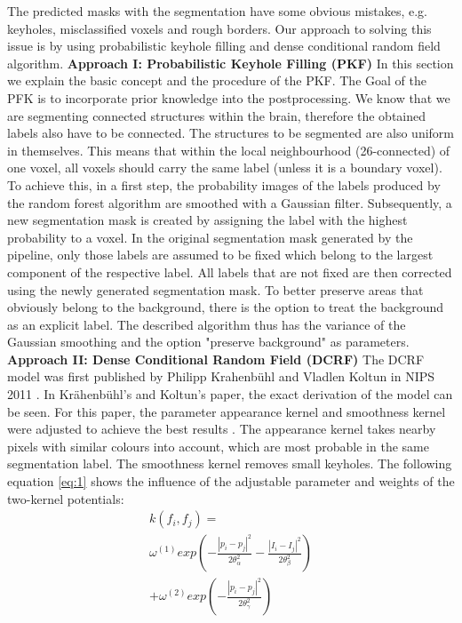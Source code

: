 \documentclass[journal]{IEEEtran}
\begin{document}
The predicted masks with the segmentation have some obvious mistakes, e.g. keyholes, misclassified voxels and rough borders. Our approach to solving this issue is by using probabilistic keyhole filling and dense conditional random field algorithm. 
\newline
\textbf{Approach I: Probabilistic Keyhole Filling (PKF)}
\newline
In this section we explain the basic concept and the procedure of the PKF. The Goal of the PFK is to incorporate prior knowledge into the postprocessing. We know that we are segmenting connected structures within the brain, therefore the obtained labels also have to be connected. The structures to be segmented are also uniform in themselves.
This means that within the local neighbourhood (26-connected) of one voxel, all voxels should carry the same label (unless it is a boundary voxel).
To achieve this, in a first step, the probability images of the labels produced by the random forest algorithm are smoothed with a Gaussian filter. Subsequently, a new segmentation mask is created by assigning the label with the highest probability to a voxel. In the original segmentation mask generated by the pipeline, only those labels are assumed to be fixed which belong to the largest component of the respective label. All labels that are not fixed are then corrected using the newly generated segmentation mask. To better preserve areas that obviously belong to the background, there is the option to treat the background as an explicit label. The described algorithm thus has the variance of the Gaussian smoothing and the option "preserve background" as parameters.
\newline
\textbf{Approach II: Dense Conditional Random Field (DCRF)}
\newline
The DCRF model was first published by Philipp Krahenbühl and Vladlen Koltun in NIPS 2011 \cite{Krahenbuhl2012}. In Krähenbühl’s and Koltun’s paper, the exact derivation of the model can be seen. For this paper, the parameter appearance kernel and smoothness kernel were adjusted to achieve the best results . The appearance kernel takes nearby pixels with similar colours into account, which are most probable in the same segmentation label. The smoothness kernel removes small keyholes. The following equation \ref{eq:1} shows the influence of the adjustable parameter and weights of the two-kernel potentials:
\begin{multline}\label{eq:1}
    k\left(f_i,f_j\right)=\\
\omega^{\left(1\right)}  exp\left(-\frac{\left| p_i - p_j\right|^2}{2\theta^2_\alpha}-\frac{\left| I_i-I_j\right|^2}{2\theta^2_\beta}\right)\\
+\omega^{\left(2\right)}exp\left(-\frac{\left|p_i-p_j\right|^2}{2\theta^2_\gamma}\right)
\end{multline}
\end{document}
